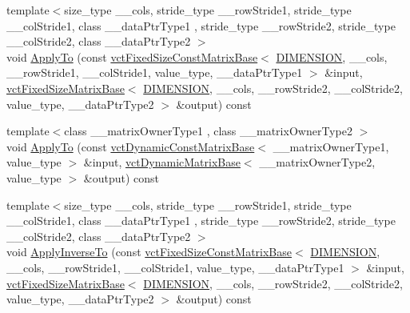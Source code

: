 \begin{DoxyCompactItemize}
{\footnotesize template$<$size\-\_\-type \-\_\-\-\_\-cols, stride\-\_\-type \-\_\-\-\_\-row\-Stride1, stride\-\_\-type \-\_\-\-\_\-col\-Stride1, class \-\_\-\-\_\-data\-Ptr\-Type1 , stride\-\_\-type \-\_\-\-\_\-row\-Stride2, stride\-\_\-type \-\_\-\-\_\-col\-Stride2, class \-\_\-\-\_\-data\-Ptr\-Type2 $>$ }\\void \hyperlink{classvct_matrix_rotation3_const_base_ab3872110e5cc432dbf0592d4af58854d}{Apply\-To} (const \hyperlink{classvct_fixed_size_const_matrix_base}{vct\-Fixed\-Size\-Const\-Matrix\-Base}$<$ \hyperlink{classvct_matrix_rotation3_const_base_a6bc9712dde55ee3fca0d7880feb6a903afdf02f4ad230d81f0ca2539c7feb61f3}{D\-I\-M\-E\-N\-S\-I\-O\-N}, \-\_\-\-\_\-cols, \-\_\-\-\_\-row\-Stride1, \-\_\-\-\_\-col\-Stride1, value\-\_\-type, \-\_\-\-\_\-data\-Ptr\-Type1 $>$ \&input, \hyperlink{classvct_fixed_size_matrix_base}{vct\-Fixed\-Size\-Matrix\-Base}$<$ \hyperlink{classvct_matrix_rotation3_const_base_a6bc9712dde55ee3fca0d7880feb6a903afdf02f4ad230d81f0ca2539c7feb61f3}{D\-I\-M\-E\-N\-S\-I\-O\-N}, \-\_\-\-\_\-cols, \-\_\-\-\_\-row\-Stride2, \-\_\-\-\_\-col\-Stride2, value\-\_\-type, \-\_\-\-\_\-data\-Ptr\-Type2 $>$ \&output) const 
\item 
{\footnotesize template$<$class \-\_\-\-\_\-matrix\-Owner\-Type1 , class \-\_\-\-\_\-matrix\-Owner\-Type2 $>$ }\\void \hyperlink{classvct_matrix_rotation3_const_base_adf7e3f5c1e4428e72e4ca671eef6447c}{Apply\-To} (const \hyperlink{classvct_dynamic_const_matrix_base}{vct\-Dynamic\-Const\-Matrix\-Base}$<$ \-\_\-\-\_\-matrix\-Owner\-Type1, value\-\_\-type $>$ \&input, \hyperlink{classvct_dynamic_matrix_base}{vct\-Dynamic\-Matrix\-Base}$<$ \-\_\-\-\_\-matrix\-Owner\-Type2, value\-\_\-type $>$ \&output) const 
\item 
{\footnotesize template$<$size\-\_\-type \-\_\-\-\_\-cols, stride\-\_\-type \-\_\-\-\_\-row\-Stride1, stride\-\_\-type \-\_\-\-\_\-col\-Stride1, class \-\_\-\-\_\-data\-Ptr\-Type1 , stride\-\_\-type \-\_\-\-\_\-row\-Stride2, stride\-\_\-type \-\_\-\-\_\-col\-Stride2, class \-\_\-\-\_\-data\-Ptr\-Type2 $>$ }\\void \hyperlink{classvct_matrix_rotation3_const_base_afd13fe59769456b1e904434344f17b4c}{Apply\-Inverse\-To} (const \hyperlink{classvct_fixed_size_const_matrix_base}{vct\-Fixed\-Size\-Const\-Matrix\-Base}$<$ \hyperlink{classvct_matrix_rotation3_const_base_a6bc9712dde55ee3fca0d7880feb6a903afdf02f4ad230d81f0ca2539c7feb61f3}{D\-I\-M\-E\-N\-S\-I\-O\-N}, \-\_\-\-\_\-cols, \-\_\-\-\_\-row\-Stride1, \-\_\-\-\_\-col\-Stride1, value\-\_\-type, \-\_\-\-\_\-data\-Ptr\-Type1 $>$ \&input, \hyperlink{classvct_fixed_size_matrix_base}{vct\-Fixed\-Size\-Matrix\-Base}$<$ \hyperlink{classvct_matrix_rotation3_const_base_a6bc9712dde55ee3fca0d7880feb6a903afdf02f4ad230d81f0ca2539c7feb61f3}{D\-I\-M\-E\-N\-S\-I\-O\-N}, \-\_\-\-\_\-cols, \-\_\-\-\_\-row\-Stride2, \-\_\-\-\_\-col\-Stride2, value\-\_\-type, \-\_\-\-\_\-data\-Ptr\-Type2 $>$ \&output) const 

\end{DoxyCompactItemize}
